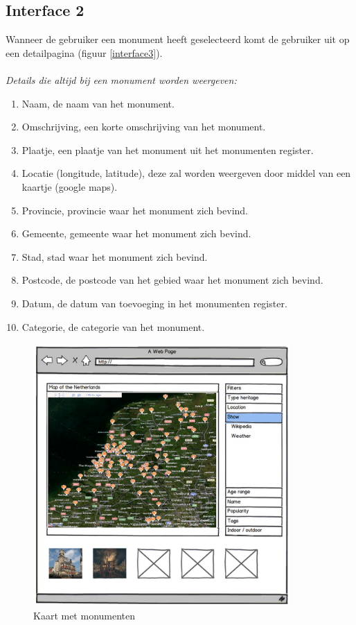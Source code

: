 \documentclass[a4paper,10pt]{article}
\begin{document}
			\subsection{Interface 2}
			Wanneer de gebruiker een monument heeft geselecteerd komt de gebruiker uit op een detailpagina (figuur \ref{interface3}).\\
			\\
			\textit{Details die altijd bij een monument worden weergeven:}
			\begin{enumerate}
				\item Naam, de naam van het monument.
				\item Omschrijving, een korte omschrijving van het monument.
				\item Plaatje, een plaatje van het monument uit het monumenten register.
				\item Locatie (longitude, latitude), deze zal worden weergeven door middel van een kaartje (google maps).
				\item Provincie, provincie waar het monument zich bevind.
				\item Gemeente, gemeente waar het monument zich bevind.
				\item Stad, stad waar het monument zich bevind.
				\item Postcode, de postcode van het gebied waar het monument zich bevind.
				\item Datum, de datum van toevoeging in het monumenten register.
				\item Categorie, de categorie van het monument.
			\end{enumerate}
			
			\begin{figure}[ht!]
				\centering
				\includegraphics[height=10cm]{interface1.png}
				\caption{Kaart met monumenten \label{interface1}}
			\end{figure}
			
\end{document}
